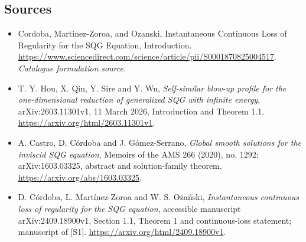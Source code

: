 \documentclass[11pt,a4paper]{article}
\numberwithin{equation}{section}
\begin{document}
\subsection{Sources}
\begin{itemize}\raggedright
\item[\textnormal{[S1]}]\hypertarget{source:statement:1}{} Cordoba, Martinez-Zoroa, and Ozanski, Instantaneous Continuous Loss of Regularity for the SQG Equation, Introduction.
\url{https://www.sciencedirect.com/science/article/pii/S0001870825004517}.
{\small\textit{Catalogue formulation source.}}
\item[\textnormal{[E1]}]\hypertarget{extra:statement:1}{} T. Y. Hou, X. Qin,
Y. Sire and Y. Wu, \emph{Self-similar blow-up profile for the one-dimensional
reduction of generalized SQG with infinite energy}, arXiv:2603.11301v1,
11 March 2026, Introduction and Theorem 1.1.
\url{https://arxiv.org/html/2603.11301v1}.
\item[\textnormal{[E2]}]\hypertarget{extra:statement:2}{} A. Castro, D. C\'ordoba
and J. G\'omez-Serrano, \emph{Global smooth solutions for the inviscid SQG
equation}, Memoirs of the AMS 266 (2020), no. 1292; arXiv:1603.03325,
abstract and solution-family theorem. \url{https://arxiv.org/abs/1603.03325}.
\item[\textnormal{[E3]}]\hypertarget{extra:statement:3}{} D. C\'ordoba,
L. Mart\'inez-Zoroa and W. S. O\.{z}a\'nski, \emph{Instantaneous continuous
loss of regularity for the SQG equation}, accessible manuscript
arXiv:2409.18900v1, Section 1.1, Theorem 1 and continuous-loss statement;
manuscript of [S1]. \url{https://arxiv.org/html/2409.18900v1}.

\end{itemize}
\end{document}
